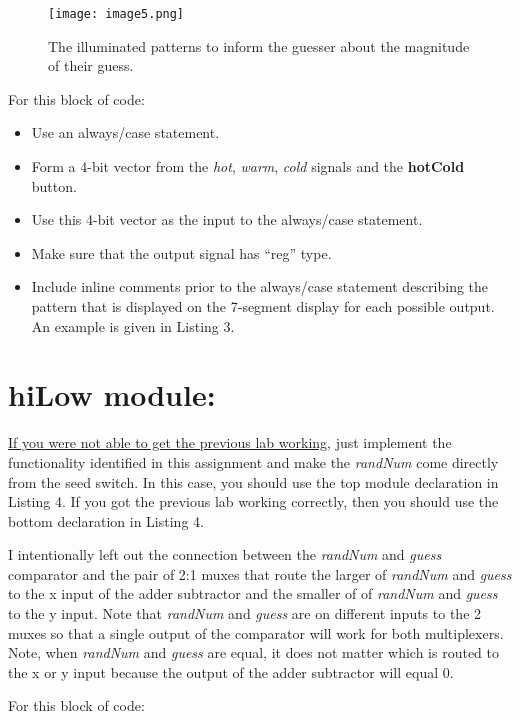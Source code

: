 \begin{figure}
\texttt{[image:  image5.png]}
\caption{The illuminated patterns to inform the guesser about the
magnitude of their guess.}
\label{figure:hiLoHintSevenSeg}
\end{figure}

For this block of code:

\begin{itemize}
\item
  Use an always/case statement.
\item
  Form a 4-bit vector from the \emph{hot}, \emph{warm}, \emph{cold}
  signals and the \textbf{hotCold} button.
\item
  Use this 4-bit vector as the input to the always/case statement.
\item
  Make sure that the output signal has ``reg'' type.
\item
  Include inline comments prior to the always/case statement describing
  the pattern that is displayed on the 7-segment display for each
  possible output. An example is given in Listing 3.
\end{itemize}

\hypertarget{hilow-module}{%
\section{hiLow module:}\label{hilow-module}}

\uline{If you were not able to get the previous lab working}, just
implement the functionality identified in this assignment and make the
\emph{randNum} come directly from the seed switch. In this case, you
should use the top module declaration in Listing 4. If you got the
previous lab working correctly, then you should use the bottom
declaration in Listing 4.

I intentionally left out the connection between the \emph{randNum} and
\emph{guess} comparator and the pair of 2:1 muxes that route the larger
of \emph{randNum} and \emph{guess} to the x input of the adder
subtractor and the smaller of of \emph{randNum} and \emph{guess} to the
y input. Note that \emph{randNum} and \emph{guess} are on different
inputs to the 2 muxes so that a single output of the comparator will
work for both multiplexers. Note, when \emph{randNum} and \emph{guess}
are equal, it does not matter which is routed to the x or y input
because the output of the adder subtractor will equal 0.

For this block of code:

